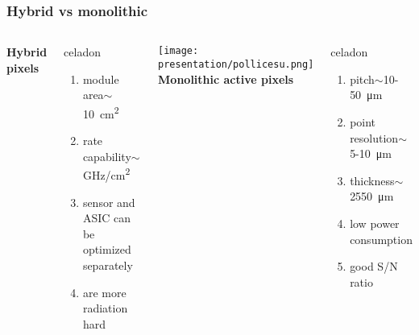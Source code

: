     \begin{frame}
        \frametitle{Hybrid vs monolithic}
        \begin{columns}
                \centering\textbf{Hybrid pixels}
                \begin{beamercolorbox}[ rounded=true, center]{celadon}
                    \begin{enumerate}
                        \item module area$\sim$\SI{10}{cm\squared}
                        \item rate capability$\sim$\si{GHz/cm\squared}
                        \item sensor and ASIC can be optimized separately
                        \item are more radiation hard 
                    \end{enumerate} 
                \end{beamercolorbox}
                \texttt{[image: presentation/pollicesu.png]}
                \centering\textbf{Monolithic active pixels}
                \begin{beamercolorbox}[ rounded=true, center]{celadon}
                    \begin{enumerate}
                        \item pitch$\sim$10-\SI{50}{\um}
                        \item point resolution$\sim$5-\SI{10}{\um}
                        \item thickness$\sim$25\SI{50}{\um}
                        \item low power consumption
                        \item good S/N ratio
                    \end{enumerate}    
                \end{beamercolorbox}
        \end{columns}
       

\end{frame}
